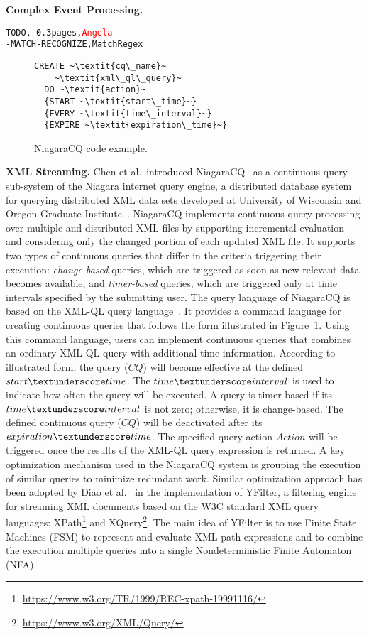 \textbf{Complex Event Processing.}
\begin{alltt}TODO\scriptsize, ~0.3 pages, \textcolor{red}{Angela}
- MATCH-RECOGNIZE \cite{zemke_et_al_2007}, MatchRegex \cite{hirzel_2012}
\end{alltt}

\begin{figure}[!h]
\begin{lstlisting}
CREATE ~\textit{cq\_name}~
    ~\textit{xml\_ql\_query}~
  DO ~\textit{action}~
  {START ~\textit{start\_time}~}
  {EVERY ~\textit{time\_interval}~}
  {EXPIRE ~\textit{expiration\_time}~}
\end{lstlisting}
\vspace*{-4mm}
\caption{\label{fig:Niagra}NiagaraCQ code example.}
\end{figure}

\textbf{XML Streaming.}
%
Chen et al.\ introduced NiagaraCQ~\cite{chen_et_al_2000} as a
continuous query sub-system of the Niagara internet query engine, a
distributed database system for querying distributed XML data sets
developed at University of Wisconsin and Oregon Graduate
Institute~\cite{naughton2001niagara}. NiagaraCQ implements continuous
query processing over multiple and distributed XML files by supporting
incremental evaluation and considering only the changed portion of
each updated XML file. It supports two types of continuous queries
that differ in the criteria triggering their execution:
\emph{change-based} queries, which are triggered as soon as new
relevant data becomes available, and \emph{timer-based} queries, which
are triggered only at time intervals specified by the submitting
user. The query language of NiagaraCQ is based on the XML-QL query
language~\cite{deutsch1999query}.  It provides a command language for
creating continuous queries that follows the form illustrated in
Figure~\ref{fig:Niagra}. Using this command language, users can
implement continuous queries that combines an ordinary XML-QL query
with additional time information.  According to illustrated form, the
query ($CQ$) will become effective at the defined
$start\textunderscore time$. The $time\textunderscore interval$ is
used to indicate how often the query will be executed. A query is
timer-based if its $time\textunderscore interval$ is not zero;
otherwise, it is change-based.  The defined continuous query ($CQ$)
will be deactivated after its $expiration\textunderscore time$. The
specified query action $Action$ will be triggered once the results of
the XML-QL query expression is returned.  A key optimization mechanism
used in the NiagaraCQ system is grouping the execution of similar
queries to minimize redundant work.  Similar optimization approach has
been adopted by Diao et al.~\cite{diao_et_al_2002} in the
implementation of YFilter, a filtering engine for streaming XML
documents based on the W3C standard XML query languages:
XPath\footnote{\url{https://www.w3.org/TR/1999/REC-xpath-19991116/}}
and XQuery\footnote{\url{https://www.w3.org/XML/Query/}}. The main
idea of YFilter is to use Finite State Machines (FSM) to represent and
evaluate XML path expressions and to combine the execution multiple
queries into a single Nondeterministic Finite Automaton (NFA).

